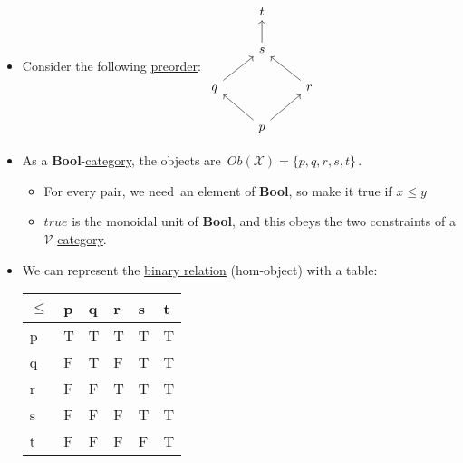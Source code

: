 \begin{itemize}
    \item  Consider the following \hyperref[D1.30]{preorder}: $\begin{tikzcd} & t & \\ & s \arrow[u] & \\q \arrow[ru] & & r \arrow[lu] \\ & p \arrow[ru] \arrow[lu] & \end{tikzcd}$
    \item As a \textbf{Bool}-\hyperref[D2.46]{category}, the objects are \,$Ob(\mathcal{X})=\{p,q,r,s,t\}$\,.
          \begin{itemize}
            \item For every pair, we need \,an element of \textbf{Bool}, so make it true if $x\leq y$\,
            \item $true$ is the monoidal unit of \textbf{Bool}, and this obeys the two constraints of a $\mathcal{V}$ \hyperref[D2.46]{category}.
          \end{itemize}
    \item We can represent the \hyperref[D1.12]{binary relation} (hom-object) with a table:\,
          \begin{minipage}{0.48\textwidth}
            \begin{tabular}{|l|l|l|l|l|l|}
              $\leq$ & p & q & r & s & t \\  \hline
              p      & T & T & T & T & T \\ \hline
              q      & F & T & F & T & T \\ \hline
              r      & F & F & T & T & T \\ \hline
              s      & F & F & F & T & T \\ \hline
              t      & F & F & F & F & T
            \end{tabular}
          \end{minipage}\,
  \end{itemize}